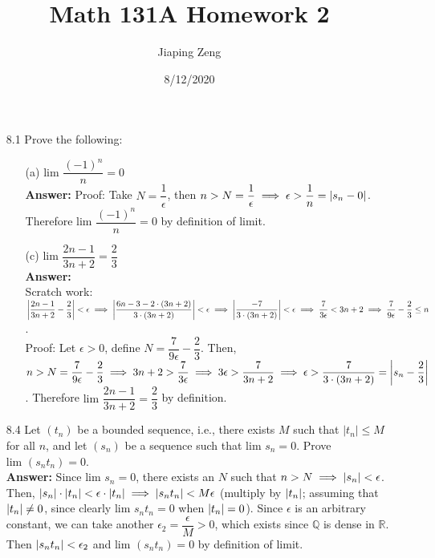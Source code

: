 \documentclass{article}
\title{Math 131A Homework 2}
\date{8/12/2020}
\author{Jiaping Zeng}
\begin{document}
\maketitle

\begin{itemize}
      \item [8.1] Prove the following:
            \begin{itemize}
                  \item [(a)] $\text{lim }\dfrac{(-1)^n}{n}=0$\\
                        \textbf{Answer: } Proof: Take $N=\dfrac{1}{\epsilon}$, then $n>N=\dfrac{1}{\epsilon}\implies\epsilon>\dfrac{1}{n}=\abs{s_n-0}$. Therefore $\text{lim }\dfrac{(-1)^n}{n}=0$ by definition of limit.
                  \item [(c)] $\text{lim }\dfrac{2n-1}{3n+2}=\dfrac{2}{3}$\\
                        \textbf{Answer: }\\
                        Scratch work: $\abs{\dfrac{2n-1}{3n+2}-\dfrac{2}{3}}<\epsilon\implies\abs{\dfrac{6n-3-2\cdot(3n+2)}{3\cdot(3n+2)}}<\epsilon\implies\abs{\dfrac{-7}{3\cdot(3n+2)}}<\epsilon\implies\dfrac{7}{3\epsilon}<3n+2\implies\dfrac{7}{9\epsilon}-\dfrac{2}{3}\leq n$.\\
                        Proof: Let $\epsilon>0$, define $N=\dfrac{7}{9\epsilon}-\dfrac{2}{3}$. Then, $n>N=\dfrac{7}{9\epsilon}-\dfrac{2}{3}\implies 3n+2>\dfrac{7}{3\epsilon}\implies 3\epsilon>\dfrac{7}{3n+2}\implies\epsilon>\dfrac{7}{3\cdot(3n+2)}=\abs{s_n-\dfrac{2}{3}}$. Therefore $\text{lim }\dfrac{2n-1}{3n+2}=\dfrac{2}{3}$ by definition.
            \end{itemize}
      \item [8.4] Let $(t_n)$ be a bounded sequence, i.e., there exists $M$ such that $|t_n|\leq M$ for all $n$, and let $(s_n)$ be a sequence such that $\text{lim }s_n=0$. Prove $\text{lim }(s_nt_n)=0$.\\
            \textbf{Answer: } Since $\text{lim }s_n=0$, there exists an $N$ such that $n>N\implies\abs{s_n}<\epsilon$. Then, $\abs{s_n}\cdot\abs{t_n}<\epsilon\cdot\abs{t_n}\implies\abs{s_nt_n}<M\epsilon$ (multiply by $\abs{t_n}$; assuming that $\abs{t_n}\neq 0$, since clearly $\text{lim }s_nt_n=0$ when $\abs{t_n}=0$). Since $\epsilon$ is an arbitrary constant, we can take another $\epsilon_2=\dfrac{\epsilon}{M}>0$, which exists since $\mathbb{Q}$ is dense in $\mathbb{R}$. Then $\abs{s_nt_n}<\epsilon_2$ and $\text{lim }(s_nt_n)=0$ by definition of limit.

\end{itemize}
\end{document}
